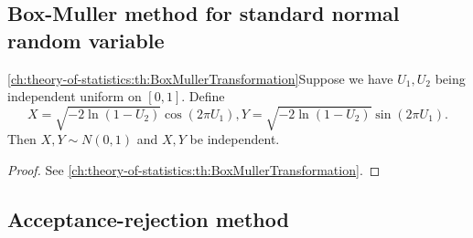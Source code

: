 \begin{refsection}
\subsection{Box-Muller method for standard normal random variable}



\begin{lemma}\autoref{ch:theory-of-statistics:th:BoxMullerTransformation}Suppose we have $U_1,U_2$ being independent uniform on $[0,1]$.
Define $$X=\sqrt{-2\ln(1-U_2)}\cos(2\pi U_1), Y=\sqrt{-2\ln(1-U_2)}\sin(2\pi U_1).$$
Then
  $X,Y\sim N(0,1)$ and $X,Y$ be independent. 
\end{lemma}
\begin{proof}
See \autoref{ch:theory-of-statistics:th:BoxMullerTransformation}.
\end{proof}

\subsection{Acceptance-rejection method}

\end{refsection}
